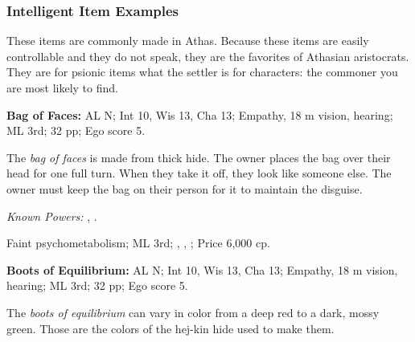 \subsubsection{Intelligent Item Examples}
These items are commonly made in Athas. Because these items are easily controllable and they do not speak, they are the favorites of Athasian aristocrats. They are for psionic items what the settler is for characters: the commoner you are most likely to find.



\textbf{Bag of Faces:}
AL N;
Int 10, Wis 13, Cha 13;
Empathy, 18 m vision, hearing;
ML 3rd;
32 pp;
Ego score 5.

The \emph{bag of faces} is made from thick hide. The owner places the bag over their head for one full turn. When they take it off, they look like someone else. The owner must keep the bag on their person for it to maintain the disguise.

\textit{Known Powers:}
    , %
    . %

Faint psychometabolism;
ML 3rd;
,
,
;
Price 6,000 cp.



\textbf{Boots of Equilibrium:}
AL N;
Int 10, Wis 13, Cha 13;
Empathy, 18 m vision, hearing;
ML 3rd;
32 pp;
Ego score 5.

The \emph{boots of equilibrium} can vary in color from a deep red to a dark, mossy green. Those are the colors of the hej-kin hide used to make them.

